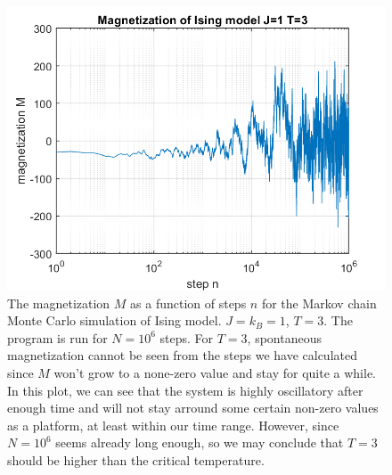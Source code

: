 \documentclass[12pt, graphicx]{article}
\begin{document}
\begin{figure}[ht]
\centering
\includegraphics[width = 120mm]{mt3.png}
\caption{The magnetization $M$ as a function of steps $n$ for the Markov chain Monte Carlo simulation of Ising model. $J=k_B=1$, $T=3$. The program is run for $N=10^6$ steps. For $T=3$, spontaneous magnetization cannot be seen from the steps we have calculated since $M$ won't grow to a none-zero value and stay for quite a while. In this plot, we can see that the system is highly oscillatory after enough time and will not stay arround some certain non-zero values as a platform, at least within our time range. However, since $N=10^6$ seems already long enough, so we may conclude that $T=3$ should be higher than the critical temperature.}
\label{fig:mt3}
\end{figure}
\end{document}
